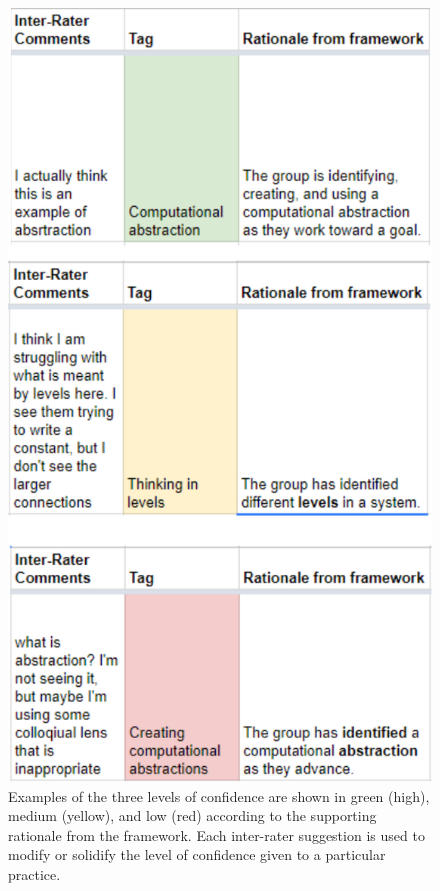\documentclass{msuphddissertation}
\begin{document}
\begin{doublespace}
\begin{figure}\centering
\includegraphics[scale=0.9]{./images/CH5LevelsofConfidence.pdf}
\caption{Examples of the three levels of confidence are shown in green (high), medium (yellow), and low (red) according to the supporting rationale from the framework.  Each inter-rater suggestion is used to modify or solidify the level of confidence given to a particular practice.}\label{CH5:LevelsofConfidence}
\end{figure}


\end{doublespace}
\end{document}
